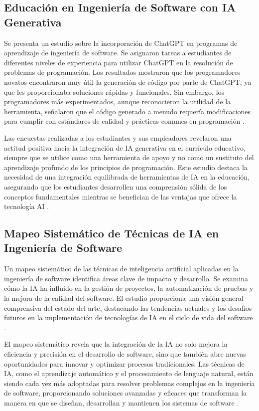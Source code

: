 \subsection{Educación en Ingeniería de Software con IA Generativa}

Se presenta un estudio sobre la incorporación de ChatGPT en programas de aprendizaje de ingeniería de software. Se asignaron tareas a estudiantes de diferentes niveles de experiencia para utilizar ChatGPT en la resolución de problemas de programación. Los resultados mostraron que los programadores novatos encontraron muy útil la generación de código por parte de ChatGPT, ya que les proporcionaba soluciones rápidas y funcionales. Sin embargo, los programadores más experimentados, aunque reconocieron la utilidad de la herramienta, señalaron que el código generado a menudo requería modificaciones para cumplir con estándares de calidad y prácticas comunes en programación \cite{Petrovska2023}.

Las encuestas realizadas a los estudiantes y sus empleadores revelaron una actitud positiva hacia la integración de IA generativa en el currículo educativo, siempre que se utilice como una herramienta de apoyo y no como un sustituto del aprendizaje profundo de los principios de programación. Este estudio destaca la necesidad de una integración equilibrada de herramientas de IA en la educación, asegurando que los estudiantes desarrollen una comprensión sólida de los conceptos fundamentales mientras se benefician de las ventajas que ofrece la tecnología AI \cite{Petrovska2023}.

\subsection{Mapeo Sistemático de Técnicas de IA en Ingeniería de Software}

Un mapeo sistemático de las técnicas de inteligencia artificial aplicadas en la ingeniería de software identifica áreas clave de impacto y desarrollo. Se examina cómo la IA ha influido en la gestión de proyectos, la automatización de pruebas y la mejora de la calidad del software. El estudio proporciona una visión general comprensiva del estado del arte, destacando las tendencias actuales y los desafíos futuros en la implementación de tecnologías de IA en el ciclo de vida del software \cite{Sofian2022}.

El mapeo sistemático revela que la integración de la IA no solo mejora la eficiencia y precisión en el desarrollo de software, sino que también abre nuevas oportunidades para innovar y optimizar procesos tradicionales. Las técnicas de IA, como el aprendizaje automático y el procesamiento de lenguaje natural, están siendo cada vez más adoptadas para resolver problemas complejos en la ingeniería de software, proporcionando soluciones avanzadas y eficaces que transforman la manera en que se diseñan, desarrollan y mantienen los sistemas de software \cite{Sofian2022}.

